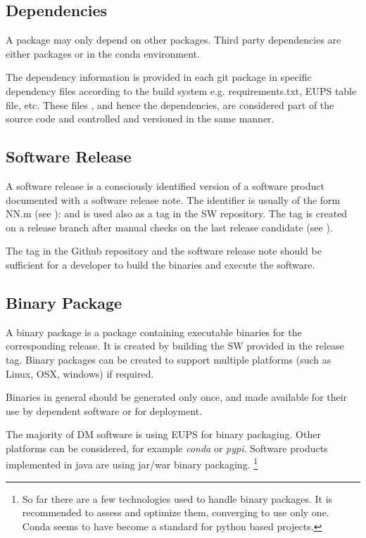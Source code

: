 \subsection{Dependencies} \label{sec:dependencies}


A package may only depend on other packages. Third party dependencies are either packages or in the conda environment.

The dependency information is provided in each git package in specific dependency files  according to the build system e.g.  requirements.txt, EUPS table file, etc.
These files , and hence the dependencies,  are considered part of the source code and controlled  and versioned in the same manner.


\subsection{Software Release} \label{sec:swrel}

A software release is  a consciously identified version of a  software product
documented with a software release note.
The identifier is usually of the form NN.m (see ): and is used also as a  tag in the SW repository.
The tag is created on a release branch after manual checks on the last release candidate (see ).

The tag in the Github repository and the software release note should be sufficient for a developer
to build the binaries and execute the software.



\subsection{Binary Package} \label{sec:swbpkg}

A binary package is a package containing executable binaries for the corresponding release.
It is created by building the SW provided in the release tag.
Binary packages can be created to support multiple platforms (such as Linux, OSX, windows) if required.

Binaries in general should be generated only once, and made available for their use by dependent software or for deployment.

The majority of DM software is using EUPS for binary packaging. Other platforms can be considered, for example \textit{conda} or \textit{pypi}.
Software products implemented in java are using jar/war binary packaging.
\footnote{So far there are a few technologies used to handle binary packages. It is recommended to assess and optimize them, converging to use only one.
Conda seems to have become a standard for python based projects.}


